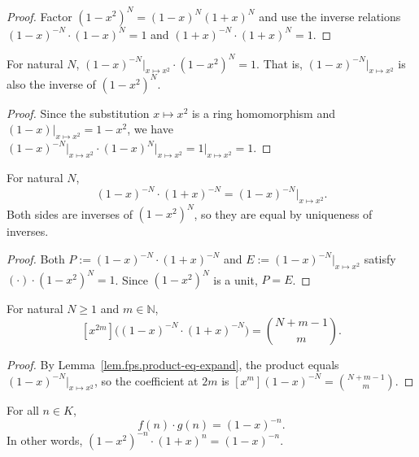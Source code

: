 \begin{proof}
Factor $(1-x^2)^N = (1-x)^N(1+x)^N$ and use the inverse relations
$(1-x)^{-N}\cdot(1-x)^N = 1$ and $(1+x)^{-N}\cdot(1+x)^N = 1$.
\end{proof}

\begin{lemma}
\label{lem.fps.expand-invOneSubPow-inv}
\leanhelper
\leanok
For natural $N$,
$(1-x)^{-N}\big|_{x \mapsto x^2}\cdot (1-x^2)^N = 1$.
That is, $(1-x)^{-N}\big|_{x \mapsto x^2}$ is also the inverse of $(1-x^2)^N$.
\end{lemma}

\begin{proof}
Since the substitution $x \mapsto x^2$ is a ring homomorphism and $(1-x)\big|_{x \mapsto x^2} = 1-x^2$,
we have $(1-x)^{-N}\big|_{x \mapsto x^2}\cdot(1-x)^N\big|_{x \mapsto x^2}
= 1\big|_{x \mapsto x^2} = 1$.
\end{proof}

\begin{lemma}
\label{lem.fps.product-eq-expand}
\leanhelper
\leanok
For natural $N$,
\[
(1-x)^{-N}\cdot(1+x)^{-N}
= (1-x)^{-N}\big|_{x \mapsto x^2}.
\]
Both sides are inverses of $(1-x^2)^N$, so they are equal by uniqueness of inverses.
\end{lemma}

\begin{proof}
Both $P := (1-x)^{-N}\cdot(1+x)^{-N}$ and
$E := (1-x)^{-N}\big|_{x \mapsto x^2}$ satisfy $(\cdot)\cdot(1-x^2)^N = 1$.
Since $(1-x^2)^N$ is a unit, $P = E$.
\end{proof}

\begin{lemma}
\label{lem.fps.coeff-invOneSubPow-product-even}
\leanhelper
\leanok
For natural $N\ge 1$ and $m\in\mathbb{N}$,
\[
[x^{2m}]\bigl((1-x)^{-N}\cdot(1+x)^{-N}\bigr) = \binom{N+m-1}{m}.
\]
\end{lemma}

\begin{proof}
By Lemma~\ref{lem.fps.product-eq-expand}, the product equals
$(1-x)^{-N}\big|_{x \mapsto x^2}$, so the coefficient at $2m$ is
$[x^m](1-x)^{-N} = \binom{N+m-1}{m}$.
\end{proof}

\begin{lemma}
\label{lem.fps.key-product-identity}
\leanhelper
\leanok
For all $n\in K$,
\[
f(n)\cdot g(n) = (1-x)^{-n}.
\]
In other words, $(1-x^2)^{-n}\cdot(1+x)^n = (1-x)^{-n}$.
\end{lemma}

